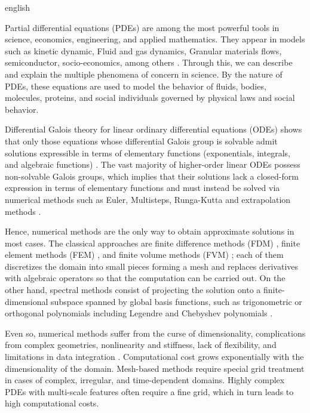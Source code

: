 
\begin{hyphenrules}{english}

\label{ch:introduction}

Partial differential equations (PDEs) are among the most powerful tools in science, economics, 
engineering, and applied mathematics. They appear in models such as kinetic dynamic, Fluid and gas dynamics, 
Granular materials flows, semiconductor, socio-economics, among others \cite{markowich2007applied}.
Through this, we can describe and explain the multiple phenomena of concern in science. By the nature
of PDEs, these equations are used to model the behavior of fluids, bodies, molecules, proteins, and
social individuals governed by physical laws and social behavior.

Differential Galois theory for linear ordinary differential equations (ODEs) shows that only those
equations whose differential Galois group is solvable admit solutions expressible in terms of
elementary functions (exponentials, integrals, and algebraic functions)
\cite{vanderput2003}. The vast majority of higher-order linear ODEs possess
non-solvable Galois groups, which implies that their solutions lack a closed-form expression in terms
of elementary functions and must instead be solved via numerical methods such as Euler, Multisteps, 
Runga-Kutta and extrapolation methods \cite{hairer1993solving, iserles1996first}.

Hence, numerical methods are the only way to obtain approximate solutions in most cases. The classical
approaches are finite difference methods (FDM) \cite{strikwerda2004}, finite element methods (FEM)
\cite{zienkiewicz2013}, and finite volume methods (FVM) \cite{moukalled2016}; each of them
discretizes the domain into small pieces forming a mesh and replaces derivatives with algebraic
operators so that the computation can be carried out. On the other hand, spectral methods consist of
projecting the solution onto a finite-dimensional subspace spanned by global basis functions, such as
trigonometric or orthogonal polynomials including Legendre and Chebyshev polynomials
\cite{shen2011}.

Even so, numerical methods suffer from the curse of dimensionality, complications from complex
geometries, nonlinearity and stiffness, lack of flexibility, and limitations in data integration
\cite{schwencke2025thesis}. Computational cost grows exponentially with the dimensionality of the
domain. Mesh-based methods require special grid treatment in cases of complex, irregular, and
time-dependent domains. Highly complex PDEs with multi-scale features often require a fine grid,
which in turn leads to high computational costs.


\end{hyphenrules}
